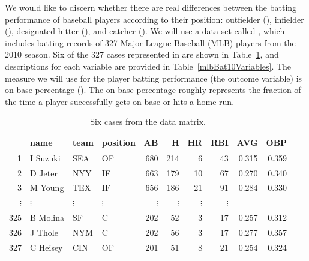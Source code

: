 We would like to discern whether there are real differences between the batting performance of baseball players according to their position: outfielder (), infielder (), designated hitter (), and catcher (). We will use a data set called , which includes batting records of 327 Major League Baseball (MLB) players from the 2010 season. Six of the 327 cases represented in  are shown in Table~\ref{mlbBat10DataMatrix}, and descriptions for each variable are provided in Table~\ref{mlbBat10Variables}. The measure we will use for the player batting performance (the outcome variable) is on-base percentage (). The on-base percentage roughly represents the fraction of the time a player successfully gets on base or hits a home run.

\begin{table}[h]
\centering
\begin{tabular}{rlllrrrrrr}
  \hline
 & name & team & position & AB & H & HR &RBI & AVG & OBP \\ 
  \hline
1 & I Suzuki & SEA & OF & 680 & 214 & 6 & 43 & 0.315 & 0.359 \\ 
  2 & D Jeter & NYY & IF & 663 & 179 & 10 & 67 & 0.270 & 0.340 \\ 
  3 & M Young & TEX & IF & 656 & 186 & 21 & 91 & 0.284 & 0.330 \\ 
  $\vdots$ & $\vdots$ & $\vdots$ & $\vdots$ & $\vdots$ & $\vdots$ & $\vdots$ & $\vdots$ \\
  325 & B Molina & SF & C & 202 & 52 & 3 & 17 & 0.257 & 0.312 \\ 
  326 & J Thole & NYM & C & 202 & 56 & 3 & 17 & 0.277 & 0.357 \\ 
  327 & C Heisey & CIN & OF & 201 & 51 & 8 & 21 & 0.254 & 0.324 \\ 
   \hline
\end{tabular}
\caption{Six cases from the  data matrix.}
\label{mlbBat10DataMatrix}
\end{table}

